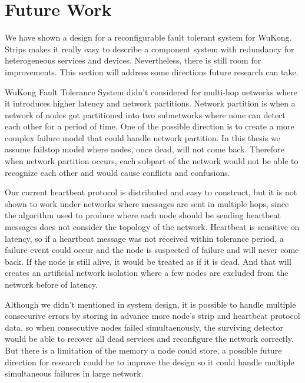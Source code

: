 \section{Future Work}

We have shown a design for a reconfigurable fault tolerant system for WuKong.
Strips makes it really easy to describe a component system with redundancy for
heterogeneous services and devices. Nevertheless, there is still room for
improvements. This section will address some directions future research can take.

WuKong Fault Tolerance System didn't considered for multi-hop networks where it
introduces higher latency and network partitions.  Network partition is when
a network of nodes got partitioned into two subnetworks where none can detect
each other for a period of time. One of the possible direction is to create
a more complex failure model that could handle network partition. In this thesis
we assume failstop model where nodes, once dead, will not come back. Therefore
when network partition occurs, each subpart of the network would not be able to
recognize each other and would cause conflicts and confusions.

Our current heartbeat protocol is distributed and easy to construct, but it is
not shown to work under networks where messages are sent in multiple hops, since
the algorithm used to produce where each node should be sending heartbeat
messages does not consider the topology of the network. Heartbeat is sensitive
on latency, so if a heartbeat message was not received within tolerance period,
a failure event could occur and the node is suspected of failure and will
never come back. If the node is still alive, it would be treated as if it is
dead. And that will creates an artificial network isolation where a few nodes
are excluded from the network before of latency.

Although we didn't mentioned in system design, it is possible to handle multiple
consecurive errors by storing in advance more node's strip and heartbeat
protocol data, so when consecutive nodes failed simultaenously, the surviving
detector would be able to recover all dead services and reconfigure the network
correctly.  But there is a limitation of the memory a node could store,
a possible future direction for research could be to improve the design so it
could handle multiple simultaneous failures in large network.


\begin{comment}
Niels suggested that I show that I am aware of such issue with determining
optimality for deployment which is not clear for WuKong yet, there are many
ways or metrics to optimize for, all I can do in this work is to identify some
tradeoffs certain deployment for fault tolerance could influence the system
with certain metrics.

Limits will be hard to define here
Niels:about the tradeoffs in determining the deployment from your fault
tolerance perspective
Penn:Remember what the prof told me, about policy, first fit, last fit, etc
\end{comment}

